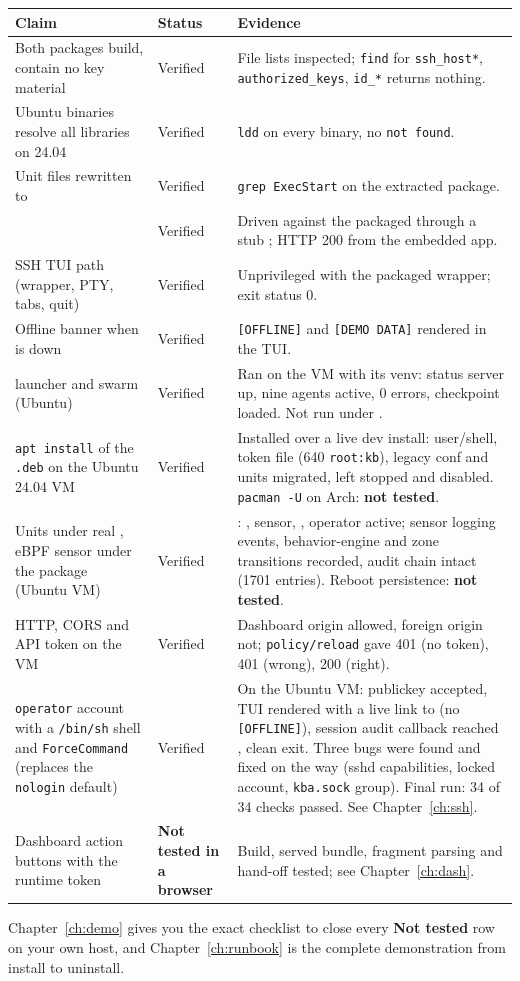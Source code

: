 \begin{center}
\small
\begin{tabularx}{\textwidth}{@{}L{5.2cm}L{2.4cm}Y@{}}
\toprule
\textbf{Claim} & \textbf{Status} & \textbf{Evidence}\\
\midrule
Both packages build, contain no key material & Verified & File lists inspected; \texttt{find} for \texttt{ssh\_host*}, \texttt{authorized\_keys}, \texttt{id\_*} returns nothing.\\
Ubuntu binaries resolve all libraries on 24.04 & Verified & \texttt{ldd} on every binary, no \texttt{not found}.\\
Unit files rewritten to  & Verified & \texttt{grep ExecStart} on the extracted package.\\
 & Verified & Driven against the packaged  through a stub ; HTTP 200 from the embedded app.\\
SSH TUI path (wrapper, PTY, tabs, quit) & Verified & Unprivileged  with the packaged wrapper; exit status 0.\\
Offline banner when  is down & Verified & \texttt{[OFFLINE]} and \texttt{[DEMO DATA]} rendered in the TUI.\\
 launcher and  swarm (Ubuntu) & Verified & Ran on the VM with its venv: status server up, nine agents active, 0 errors, checkpoint loaded. Not run under .\\
\texttt{apt install} of the \texttt{.deb} on the Ubuntu 24.04 VM & Verified & Installed over a live dev install: user/shell, token file (640 \texttt{root:kb}), legacy conf and units migrated,  left stopped and disabled. \texttt{pacman -U} on Arch: \textbf{not tested}.\\
Units under real , eBPF sensor under the package (Ubuntu VM) & Verified & : , sensor, , operator  active; sensor logging events, behavior-engine and zone transitions recorded, audit chain intact (1701 entries). Reboot persistence: \textbf{not tested}.\\
 HTTP, CORS and API token on the VM & Verified & Dashboard origin allowed, foreign origin not; \texttt{policy/reload} gave 401 (no token), 401 (wrong), 200 (right).\\
\texttt{operator} account with a \texttt{/bin/sh} shell and \texttt{ForceCommand} (replaces the \texttt{nologin} default) & Verified & On the Ubuntu VM: publickey accepted, TUI rendered with a live link to  (no \texttt{[OFFLINE]}), session audit callback reached , clean exit. Three bugs were found and fixed on the way (sshd capabilities, locked account, \texttt{kba.sock} group). Final run: 34 of 34 checks passed. See Chapter~\ref{ch:ssh}.\\
Dashboard action buttons with the runtime token & \textbf{Not tested in a browser} & Build, served bundle, fragment parsing and  hand-off tested; see Chapter~\ref{ch:dash}.\\
\bottomrule
\end{tabularx}
\end{center}
Chapter~\ref{ch:demo} gives you the exact checklist to close every \textbf{Not tested} row on your own host, and Chapter~\ref{ch:runbook} is the complete demonstration from install to uninstall.
